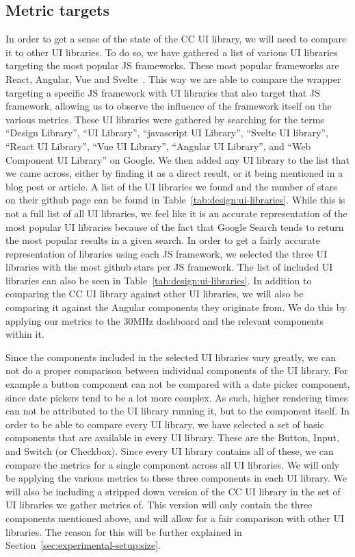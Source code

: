 \subsection{Metric targets}
In order to get a sense of the state of the CC UI library, we will need to compare it to other UI libraries. To do so, we have gathered a list of various UI libraries targeting the most popular JS frameworks. These most popular frameworks are React, Angular, Vue and Svelte~. This way we are able to compare the wrapper targeting a specific JS framework with UI libraries that also target that JS framework, allowing us to observe the influence of the framework itself on the various metrics. These UI libraries were gathered by searching for the terms ``Design Library'', ``UI Library'', ``javascript UI Library'', ``Svelte UI library'', ``React UI Library'', ``Vue UI Library'', ``Angular UI Library'', and ``Web Component UI Library'' on Google. We then added any UI library to the list that we came across, either by finding it as a direct result, or it being mentioned in a blog post or article. A list of the UI libraries we found and the number of stars on their github page can be found in Table~\ref{tab:design:ui-libraries}. While this is not a full list of all UI libraries, we feel like it is an accurate representation of the most popular UI libraries because of the fact that Google Search tends to return the most popular results in a given search. In order to get a fairly accurate representation of libraries using each JS framework, we selected the three UI libraries with the most github stars per JS framework. The list of included UI libraries can also be seen in Table~\ref{tab:design:ui-libraries}. In addition to comparing the CC UI library against other UI libraries, we will also be comparing it against the Angular components they originate from. We do this by applying our metrics to the 30MHz dashboard and the relevant components within it.

Since the components included in the selected UI libraries vary greatly, we can not do a proper comparison between individual components of the UI library. For example a button component can not be compared with a date picker component, since date pickers tend to be a lot more complex. As such, higher rendering times can not be attributed to the UI library running it, but to the component itself. In order to be able to compare every UI library, we have selected a set of basic components that are available in every UI library. These are the Button, Input, and Switch (or Checkbox). Since every UI library contains all of these, we can compare the metrics for a single component across all UI libraries. We will only be applying the various metrics to these three components in each UI library. We will also be including a stripped down version of the CC UI library in the set of UI libraries we gather metrics of. This version will only contain the three components mentioned above, and will allow for a fair comparison with other UI libraries. The reason for this will be further explained in Section~\ref{sec:experimental-setup:size}.

